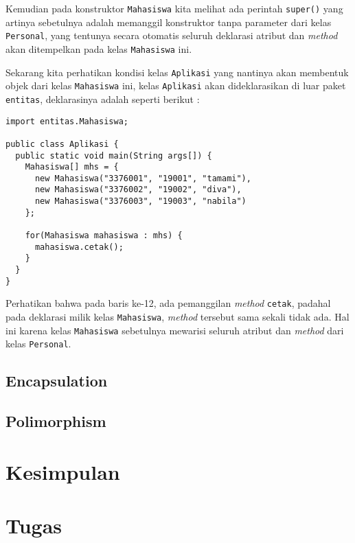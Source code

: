 Kemudian pada konstruktor \texttt{Mahasiswa} kita melihat ada perintah \texttt{super()} yang artinya sebetulnya adalah memanggil konstruktor tanpa parameter dari kelas \texttt{Personal}, yang tentunya secara otomatis seluruh deklarasi atribut dan \textit{method} akan ditempelkan pada kelas \texttt{Mahasiswa} ini.

Sekarang kita perhatikan kondisi kelas \texttt{Aplikasi} yang nantinya akan membentuk objek dari kelas \texttt{Mahasiswa} ini, kelas \texttt{Aplikasi} akan dideklarasikan di luar paket \texttt{entitas}, deklarasinya adalah seperti berikut :

\begin{lstlisting}
import entitas.Mahasiswa;

public class Aplikasi {
  public static void main(String args[]) {
    Mahasiswa[] mhs = {
      new Mahasiswa("3376001", "19001", "tamami"),
      new Mahasiswa("3376002", "19002", "diva"),
      new Mahasiswa("3376003", "19003", "nabila")
    };

    for(Mahasiswa mahasiswa : mhs) {
      mahasiswa.cetak();
    }
  }
}
\end{lstlisting}

Perhatikan bahwa pada baris ke-12, ada pemanggilan \textit{method} \texttt{cetak}, padahal pada deklarasi milik kelas \texttt{Mahasiswa}, \textit{method} tersebut sama sekali tidak ada. Hal ini karena kelas \texttt{Mahasiswa} sebetulnya mewarisi seluruh atribut dan \textit{method} dari kelas \texttt{Personal}.

\subsection{Encapsulation}

\subsection{Polimorphism}

\section{Kesimpulan}

\section{Tugas}